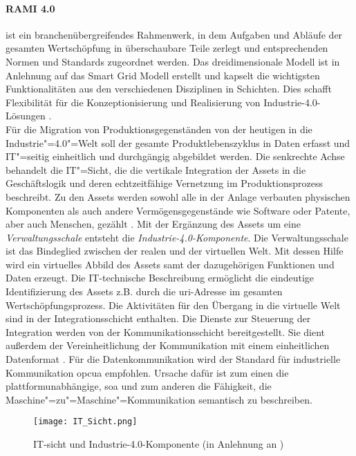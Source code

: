 \paragraph{RAMI 4.0} ist ein branchenübergreifendes Rahmenwerk, in dem Aufgaben und Abläufe der gesamten Wertschöpfung in überschaubare Teile zerlegt und entsprechenden Normen und Standards zugeordnet werden. Das dreidimensionale Modell ist in Anlehnung auf das Smart Grid Modell erstellt und kapselt die wichtigsten Funktionalitäten aus den verschiedenen Disziplinen in Schichten. Dies schafft Flexibilität für die Konzeptionisierung und Realisierung von Industrie-4.0-Lösungen \citep{Huebner2017}.
\\
Für die Migration von Produktionsgegenständen von der heutigen in die Industrie"=4.0"=Welt soll der gesamte Produktlebenszyklus in Daten erfasst und IT"=seitig einheitlich und durchgängig abgebildet werden. Die senkrechte Achse behandelt die IT"=Sicht, die die vertikale Integration der Assets in die Geschäftslogik und deren echtzeitfähige Vernetzung im Produktionsprozess beschreibt. Zu den Assets werden sowohl alle in der Anlage verbauten physischen Komponenten als auch andere Vermögensgegenstände wie Software oder Patente, aber auch Menschen, gezählt \citep{Adolphs2017}. Mit der Ergänzung des Assets um eine \textit{Verwaltungsschale} entsteht die \textit{Industrie-4.0-Komponente}. Die Verwaltungsschale ist das Bindeglied zwischen der realen und der virtuellen Welt. Mit dessen Hilfe wird ein virtuelles Abbild des Assets samt der dazugehörigen Funktionen und Daten erzeugt. Die IT-technische Beschreibung ermöglicht die eindeutige Identifizierung des Assets z.B. durch die \ac{uri}-Adresse im gesamten Wertschöpfungsprozess. Die Aktivitäten für den Übergang in die virtuelle Welt sind in der Integrationsschicht enthalten. Die Dienste zur Steuerung der Integration werden von der Kommunikationsschicht bereitgestellt. Sie dient außerdem der Vereinheitlichung der Kommunikation mit einem einheitlichen Datenformat \citep{BITKOM2015}. Für die Datenkommunikation wird der Standard für industrielle Kommunikation \ac{opcua} empfohlen. Ursache dafür ist zum einen die plattformunabhängige, \ac{soa} und zum anderen die Fähigkeit, die Maschine"=zu"=Maschine"=Kommunikation semantisch zu beschreiben.
\begin{figure}[h]
  \centering
  \texttt{[image: IT\_Sicht.png]}
  \caption[IT-sicht und Industrie-4.0-Komponente]{IT-sicht und Industrie-4.0-Komponente (in Anlehnung an \citet[S. 118]{Adolphs2017}) }
  \label{it_layer}
\end{figure}
